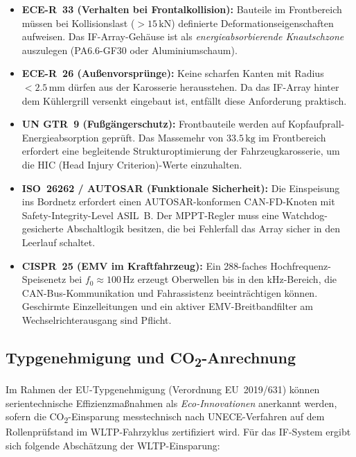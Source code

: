 ﻿\documentclass[12pt, a4paper]{report}
\theoremstyle{definition}
\theoremstyle{remark}
\begin{document}
\begin{itemize}
  \item \textbf{ECE-R~33 (Verhalten bei Frontalkollision):} Bauteile im
        Frontbereich müssen bei Kollisionslast ($> 15\,\text{kN}$) definierte
        Deformationseigenschaften aufweisen. Das IF-Array-Gehäuse ist als
        \emph{energieabsorbierende Knautschzone} auszulegen (PA6.6-GF30
        oder Aluminiumschaum).

  \item \textbf{ECE-R~26 (Außenvorsprünge):} Keine scharfen Kanten mit
        Radius $< 2.5\,\text{mm}$ dürfen aus der Karosserie herausstehen.
        Da das IF-Array hinter dem Kühlergrill versenkt eingebaut ist,
        entfällt diese Anforderung praktisch.

  \item \textbf{UN GTR~9 (Fußgängerschutz):} Frontbauteile werden auf
        Kopfaufprall-Energie\-absorption geprüft. Das Massemehr von
        $33.5\,\text{kg}$ im Frontbereich erfordert eine begleitende
        Strukturoptimierung der Fahrzeugkarosserie, um die HIC
        (Head Injury Criterion)-Werte einzuhalten.

  \item \textbf{ISO~26262 / AUTOSAR (Funktionale Sicherheit):} Die
        Einspeisung ins Bordnetz erfordert einen AUTOSAR-konformen
        CAN-FD-Knoten mit Safety-Integrity-Level ASIL~B. Der MPPT-Regler
        muss eine Watchdog-gesicherte Abschaltlogik besitzen, die bei
        Fehlerfall das Array sicher in den Leerlauf schaltet.

  \item \textbf{CISPR~25 (EMV im Kraftfahrzeug):} Ein 288-faches Hochfrequenz-
        Speisenetz bei $f_0 \approx 100\,\text{Hz}$ erzeugt Oberwellen bis
        in den kHz-Bereich, die CAN-Bus-Kommunikation und Fahrassistenz
        beeinträchtigen können. Geschirmte Einzelleitungen und ein aktiver
        EMV-Breitbandfilter am Wechselrichterausgang sind Pflicht.
\end{itemize}

\subsection{\texorpdfstring{Typgenehmigung und CO\textsubscript{2}-Anrechnung}{Typgenehmigung und CO2-Anrechnung}}

Im Rahmen der EU-Typgenehmigung (Verordnung EU~2019/631) können
serien\-technische Effizienzmaßnahmen als \emph{Eco-Innovationen}
anerkannt werden, sofern die CO\textsubscript{2}-Einsparung messtechnisch
nach UNECE-Verfahren auf dem Rollenprüfstand im WLTP-Fahrzyklus zertifiziert
wird. Für das IF-System ergibt sich folgende Abschätzung der WLTP-Einsparung:
\end{document}
